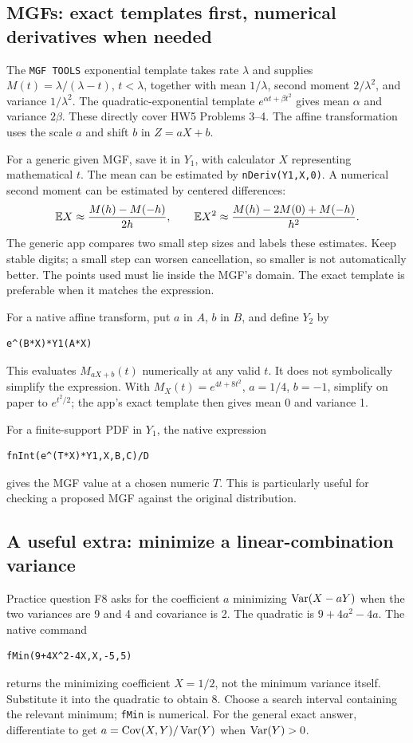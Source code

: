 \subsection{MGFs: exact templates first, numerical derivatives when needed}
The \texttt{MGF TOOLS} exponential template takes rate $\lambda$ and supplies $M(t)=\lambda/(\lambda-t)$, $t<\lambda$, together with mean $1/\lambda$, second moment $2/\lambda^2$, and variance $1/\lambda^2$. The quadratic-exponential template $e^{\alpha t+\beta t^2}$ gives mean $\alpha$ and variance $2\beta$. These directly cover HW5 Problems 3--4. The affine transformation uses the scale $a$ and shift $b$ in $Z=aX+b$.

For a generic given MGF, save it in $Y_1$, with calculator $X$ representing mathematical $t$. The mean can be estimated by \texttt{nDeriv(Y1,X,0)}. A numerical second moment can be estimated by centered differences:
\[
\mathbb E X\approx\frac{M(h)-M(-h)}{2h},\qquad
\mathbb E X^2\approx\frac{M(h)-2M(0)+M(-h)}{h^2}.
\]
The generic app compares two small step sizes and labels these estimates. Keep stable digits; a small step can worsen cancellation, so smaller is not automatically better. The points used must lie inside the MGF's domain. The exact template is preferable when it matches the expression.

For a native affine transform, put $a$ in $A$, $b$ in $B$, and define $Y_2$ by
\begin{verbatim}
e^(B*X)*Y1(A*X)
\end{verbatim}
This evaluates $M_{aX+b}(t)$ numerically at any valid $t$. It does not symbolically simplify the expression. With $M_X(t)=e^{4t+8t^2}$, $a=1/4$, $b=-1$, simplify on paper to $e^{t^2/2}$; the app's exact template then gives mean 0 and variance 1.

For a finite-support PDF in $Y_1$, the native expression
\begin{verbatim}
fnInt(e^(T*X)*Y1,X,B,C)/D
\end{verbatim}
gives the MGF value at a chosen numeric $T$. This is particularly useful for checking a proposed MGF against the original distribution.

\subsection{A useful extra: minimize a linear-combination variance}
Practice question F8 asks for the coefficient $a$ minimizing $\operatorname{Var}(X-aY)$ when the two variances are 9 and 4 and covariance is 2. The quadratic is $9+4a^2-4a$. The native command
\begin{verbatim}
fMin(9+4X^2-4X,X,-5,5)
\end{verbatim}
returns the minimizing coefficient $X=1/2$, not the minimum variance itself. Substitute it into the quadratic to obtain 8. Choose a search interval containing the relevant minimum; \texttt{fMin} is numerical. For the general exact answer, differentiate to get $a=\operatorname{Cov}(X,Y)/\operatorname{Var}(Y)$ when $\operatorname{Var}(Y)>0$.

